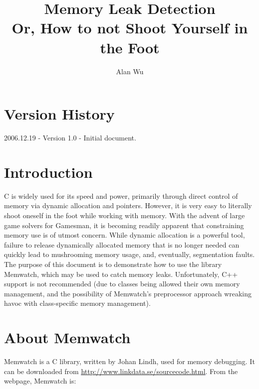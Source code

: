 \documentclass[11pt]{article}
\newcommand{\gchref}[2]{\textcolor{blue}{\underline{\href{#1}{#2}}}}
\begin{document}
\title{Memory Leak Detection\\Or, How to not Shoot Yourself in the Foot}
\author{Alan Wu}
\date{}
\maketitle

\section*{Version History}
2006.12.19 - Version 1.0 - Initial document.

\tableofcontents
\newpage

\section{Introduction}
C is widely used for its speed and power, primarily through direct control of memory via dynamic allocation and pointers. However, it is very easy to literally shoot oneself in the foot while working with memory. With the advent of large game solvers for Gamesman, it is becoming readily apparent that constraining memory use is of utmost concern. While dynamic allocation is a powerful tool, failure to release dynamically allocated memory that is no longer needed can quickly lead to mushrooming memory usage, and, eventually, segmentation faults. The purpose of this document is to demonstrate how to use the library Memwatch, which may be used to catch memory leaks. Unfortunately, C++ support is not recommended (due to classes being allowed their own memory management, and the possibility of Memwatch's preprocessor approach wreaking havoc with class-specific memory management).

\section{About Memwatch}
Memwatch is a C library, written by Johan Lindh, used for memory debugging. It can be downloaded from \gchref{http://www.linkdata.se/sourcecode.html}{http://www.linkdata.se/sourcecode.html}. From the webpage, Memwatch is:
\end{document}
